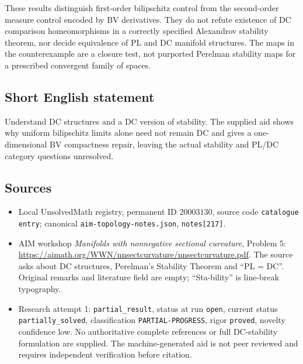 \documentclass[11pt]{article}
\begin{document}
These results distinguish first-order bilipschitz control from the second-order measure control encoded by BV derivatives. They do not refute existence of DC comparison homeomorphisms in a correctly specified Alexandrov stability theorem, nor decide equivalence of PL and DC manifold structures. The maps in the counterexample are a closure test, not purported Perelman stability maps for a prescribed convergent family of spaces.
\subsection{Short English statement}
Understand DC structures and a DC version of stability. The supplied aid shows why uniform bilipschitz limits alone need not remain DC and gives a one-dimensional BV compactness repair, leaving the actual stability and PL/DC category questions unresolved.
\subsection{Sources}
\begin{itemize}
\item Local UnsolvedMath registry, permanent ID $20003130$, source code \texttt{catalogue entry}; canonical \texttt{aim-topology-notes.json}, \texttt{notes[217]}.
\item AIM workshop \emph{Manifolds with nonnegative sectional curvature}, Problem 5: \url{https://aimath.org/WWN/nnsectcurvature/nnsectcurvature.pdf}. The source asks about DC structures, Perelman's Stability Theorem and ``PL = DC''. Original remarks and literature field are empty; ``Sta-bility'' is line-break typography.
\item Research attempt 1: \texttt{partial\_result}, status at run \texttt{open}, current status \texttt{partially\_solved}, classification \texttt{PARTIAL-PROGRESS}, rigor \texttt{proved}, novelty confidence low. No authoritative complete references or full DC-stability formulation are supplied. The machine-generated aid is not peer reviewed and requires independent verification before citation.
\end{itemize}
\end{document}
